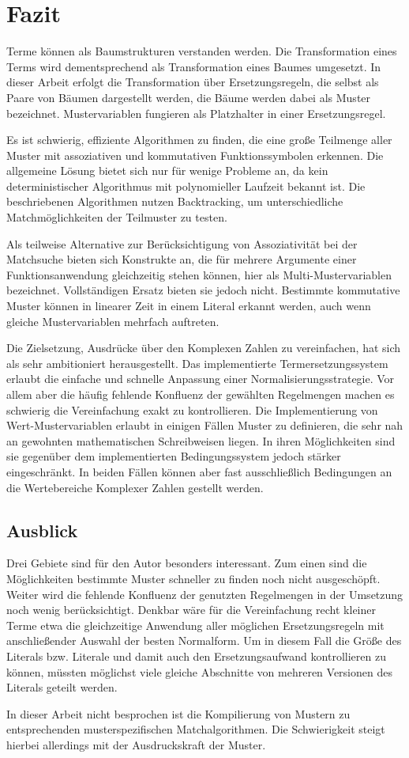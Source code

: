 

\chapter{Fazit} \label{secZusammenfassung}
Terme können als Baumstrukturen verstanden werden. Die Transformation eines Terms wird dementsprechend als Transformation eines Baumes umgesetzt. In dieser Arbeit erfolgt die Transformation über Ersetzungsregeln, die selbst als Paare von Bäumen dargestellt werden, die Bäume werden dabei als Muster bezeichnet. Mustervariablen fungieren als Platzhalter in einer Ersetzungsregel.

Es ist schwierig, effiziente Algorithmen zu finden, die eine große Teilmenge aller Muster mit assoziativen und kommutativen Funktionssymbolen erkennen. Die allgemeine Lösung bietet sich nur für wenige Probleme an, da kein deterministischer Algorithmus mit polynomieller Laufzeit bekannt ist. 
Die beschriebenen Algorithmen nutzen Backtracking, um unterschiedliche Matchmöglichkeiten der Teilmuster zu testen. 

Als teilweise Alternative zur Berücksichtigung von Assoziativität bei der Matchsuche bieten sich Konstrukte an, die für mehrere Argumente einer Funktionsanwendung gleichzeitig stehen können, hier als Multi-Mustervariablen bezeichnet. Vollständigen Ersatz bieten sie jedoch nicht.
Bestimmte kommutative Muster können in linearer Zeit in einem Literal erkannt werden, auch wenn gleiche Mustervariablen mehrfach auftreten. 

Die Zielsetzung, Ausdrücke über den Komplexen Zahlen zu vereinfachen, hat sich als sehr ambitioniert herausgestellt. Das implementierte Termersetzungssystem erlaubt die einfache und schnelle Anpassung einer Normalisierungsstrategie. Vor allem aber die häufig fehlende Konfluenz der gewählten Regelmengen machen es schwierig die Vereinfachung exakt zu kontrollieren. 
Die Implementierung von Wert-Mustervariablen erlaubt in einigen Fällen Muster zu definieren, die sehr nah an gewohnten mathematischen Schreibweisen liegen. In ihren Möglichkeiten sind sie gegenüber dem implementierten Bedingungssystem jedoch stärker eingeschränkt. In beiden Fällen können aber fast ausschließlich Bedingungen an die Wertebereiche Komplexer Zahlen gestellt werden.

\section{Ausblick}
Drei Gebiete sind für den Autor besonders interessant. Zum einen sind die Möglichkeiten bestimmte Muster schneller zu finden noch nicht ausgeschöpft. Weiter wird die fehlende Konfluenz der genutzten Regelmengen in der Umsetzung noch wenig berücksichtigt. Denkbar wäre für die Vereinfachung recht kleiner Terme etwa die gleichzeitige Anwendung aller möglichen Ersetzungsregeln mit anschließender Auswahl der besten Normalform. Um in diesem Fall die Größe des Literals bzw. Literale und damit auch den Ersetzungsaufwand kontrollieren zu können, müssten möglichst viele gleiche Abschnitte von mehreren Versionen des Literals geteilt werden. 

In dieser Arbeit nicht besprochen ist die Kompilierung von Mustern zu entsprechenden musterspezifischen Matchalgorithmen. Die Schwierigkeit steigt hierbei allerdings mit der Ausdruckskraft der Muster.






